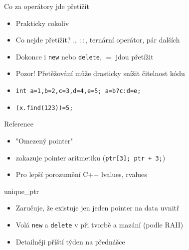 \documentclass[aspectratio=1610]{beamer}
\begin{document}
\begin{frame}{Co za operátory jde přetížit}

\begin{itemize}
  \item Prakticky cokoliv
  \item Co nejde přetížit? $.$, $::$, ternární operátor, pár dalších
  \item Dokonce i \texttt{new} nebo \texttt{delete}, $=$ jdou přetížit
  \item Pozor! Přetěžování může drasticky snížit čitelnost kódu

  \item \texttt{int a=1,b=2,c=3,d=4,e=5; a=b?c:d=e;}
  \item \texttt{(x.find(123))=5;}
\end{itemize}

\end{frame}

\begin{frame}{Reference}

\begin{itemize}
  \item "Omezený pointer"
  \item zakazuje pointer aritmetiku (\texttt{ptr[3]; ptr + 3;})
  \item Pro lepší porozumění C++ lvalues, rvalues\cite{youtube:lvalue_rvalue}
\end{itemize}

\end{frame}

\begin{frame}{unique\_ptr}

\begin{itemize}
  \item Zaručuje, že existuje jen jeden pointer na data uvnitř
  \item Volá \texttt{new} a \texttt{delete} v při tvorbě a mazání (podle RAII)
  \item Detailněji příští týden na přednášce
\end{itemize}

\end{frame}

\printbibliography
\end{document}
